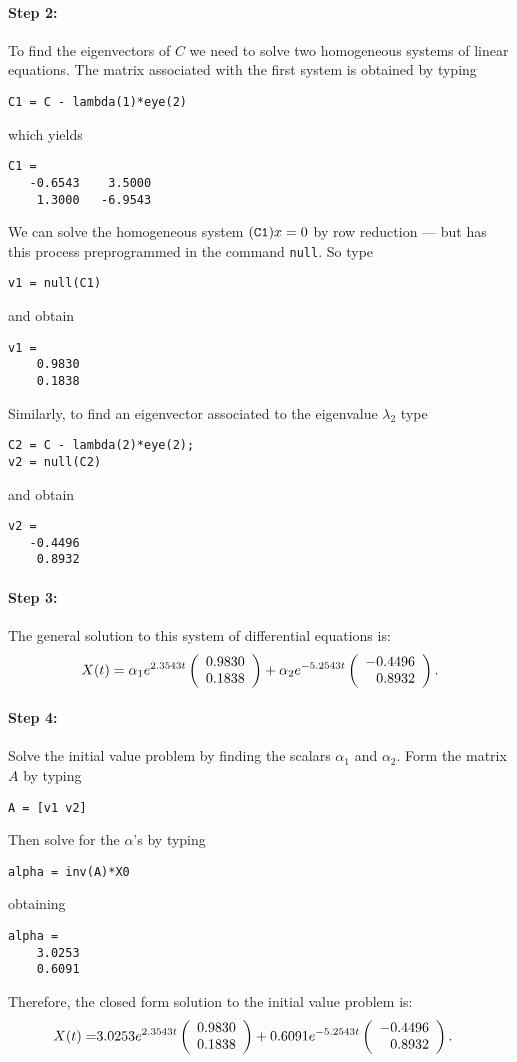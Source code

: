 \documentclass{ximera}
\begin{document}
\paragraph{Step 2:}  To find the eigenvectors of $C$ we need to solve
two homogeneous systems of linear equations.
The matrix associated with the first system is obtained by typing
\begin{verbatim}
C1 = C - lambda(1)*eye(2)
\end{verbatim}
which yields
\begin{verbatim}
C1 =
   -0.6543    3.5000
    1.3000   -6.9543
\end{verbatim}
We can solve the homogeneous system $({\tt C1})x=0$ by row reduction --- but 
\Matlab has this process preprogrammed in the command {\tt null}. 
  So type
\begin{verbatim}
v1 = null(C1)
\end{verbatim}
and obtain
\begin{verbatim}
v1 =
    0.9830
    0.1838
\end{verbatim}
Similarly, to find an eigenvector associated to the eigenvalue $\lambda_2$
type
\begin{verbatim}
C2 = C - lambda(2)*eye(2);
v2 = null(C2)
\end{verbatim}
and obtain
\begin{verbatim}
v2 =
   -0.4496
    0.8932
\end{verbatim}


\paragraph{Step 3:}  The general solution to this system of differential
equations is:
\[
X(t) = \alpha_1 e^{2.3543t}\left(\begin{array}{r} 0.9830 \\ 0.1838\end{array}\right) +
\alpha_2e^{-5.2543t}\left(\begin{array}{r} -0.4496 \\ 0.8932\end{array}\right).
\]


\paragraph{Step 4:}  Solve the initial value problem by finding the scalars
$\alpha_1$ and $\alpha_2$.   Form the matrix $A$ by typing
\begin{verbatim}
A = [v1 v2]
\end{verbatim}
Then solve for the $\alpha$'s by typing
\begin{verbatim}
alpha = inv(A)*X0
\end{verbatim}
obtaining
\begin{verbatim}
alpha =
    3.0253
    0.6091
\end{verbatim}

Therefore, the closed form solution to the initial value problem is:
\begin{align*}
  X(t) = & 3.0253 e^{2.3543t}\left(\begin{array}{r} 0.9830 \\ 0.1838\end{array}\right) 
  + 0.6091 e^{-5.2543t}\left(\begin{array}{r} -0.4496 \\ 0.8932\end{array}\right).
\end{align*}



\end{document}
